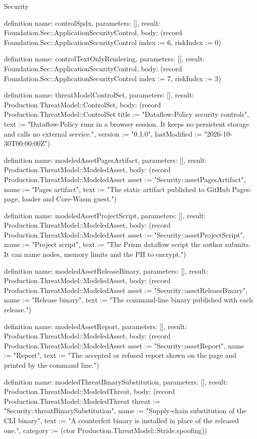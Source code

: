 \begin{lexlean}{Security}
\begin{semanticmodule}
definition{
  name: controlSpdx,
  parameters: [],
  result: Foundation.Sec::ApplicationSecurityControl,
  body: (record Foundation.Sec::ApplicationSecurityControl {index := 6, riskIndex := 0})
}

definition{
  name: controlTextOnlyRendering,
  parameters: [],
  result: Foundation.Sec::ApplicationSecurityControl,
  body: (record Foundation.Sec::ApplicationSecurityControl {index := 7, riskIndex := 3})
}

definition{
  name: threatModelControlSet,
  parameters: [],
  result: Production.ThreatModel::ControlSet,
  body: (record Production.ThreatModel::ControlSet {title := "Dataflow-Policy security controls", text := "Dataflow-Policy runs in a browser session. It keeps no persistent storage and calls no external service.", version := "0.1.0", lastModified := "2026-10-30T00:00:00Z"})
}

definition{
  name: modeledAssetPagesArtifact,
  parameters: [],
  result: Production.ThreatModel::ModeledAsset,
  body: (record Production.ThreatModel::ModeledAsset {asset := "Security::assetPagesArtifact", name := "Pages artifact", text := "The static artifact published to GitHub Pages: page, loader and Core-Wasm guest."})
}

definition{
  name: modeledAssetProjectScript,
  parameters: [],
  result: Production.ThreatModel::ModeledAsset,
  body: (record Production.ThreatModel::ModeledAsset {asset := "Security::assetProjectScript", name := "Project script", text := "The Prism dataflow script the author submits. It can name nodes, memory limits and the PII to encrypt."})
}

definition{
  name: modeledAssetReleaseBinary,
  parameters: [],
  result: Production.ThreatModel::ModeledAsset,
  body: (record Production.ThreatModel::ModeledAsset {asset := "Security::assetReleaseBinary", name := "Release binary", text := "The command-line binary published with each release."})
}

definition{
  name: modeledAssetReport,
  parameters: [],
  result: Production.ThreatModel::ModeledAsset,
  body: (record Production.ThreatModel::ModeledAsset {asset := "Security::assetReport", name := "Report", text := "The accepted or refused report shown on the page and printed by the command line."})
}

definition{
  name: modeledThreatBinarySubstitution,
  parameters: [],
  result: Production.ThreatModel::ModeledThreat,
  body: (record Production.ThreatModel::ModeledThreat {threat := "Security::threatBinarySubstitution", name := "Supply-chain substitution of the CLI binary", text := "A counterfeit binary is installed in place of the released one.", category := (ctor Production.ThreatModel::Stride.spoofing)})
}


\end{semanticmodule}
\end{lexlean}
